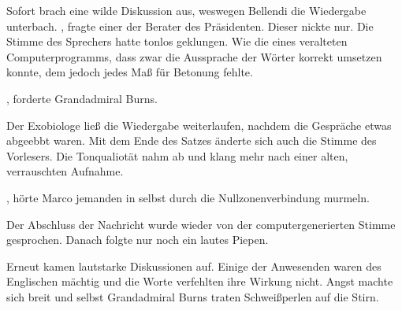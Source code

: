 
\par

Sofort brach eine wilde Diskussion aus, weswegen Bellendi die Wiedergabe unterbach. , fragte einer der Berater des Präsidenten. Dieser nickte nur. Die Stimme des Sprechers hatte tonlos geklungen. Wie die eines veralteten Computerprogramms, dass zwar die Aussprache der Wörter korrekt umsetzen konnte, dem jedoch jedes Maß für Betonung fehlte.

\par

, forderte Grandadmiral Burns. 

\par

Der Exobiologe ließ die Wiedergabe weiterlaufen, nachdem die Gespräche etwas abgeebbt waren.  Mit dem Ende des Satzes änderte sich auch die Stimme des Vorlesers. Die Tonqualiotät nahm ab und klang mehr nach einer alten, verrauschten Aufnahme. 

\par

, hörte Marco jemanden in selbst durch die Nullzonenverbindung murmeln.

\par

Der Abschluss der Nachricht wurde wieder von der computergenerierten Stimme gesprochen.  Danach folgte nur noch ein lautes Piepen.

\par

Erneut kamen lautstarke Diskussionen auf. Einige der Anwesenden waren des Englischen mächtig und die Worte verfehlten ihre Wirkung nicht. Angst machte sich breit und selbst Grandadmiral Burns traten Schweißperlen auf die Stirn. 

